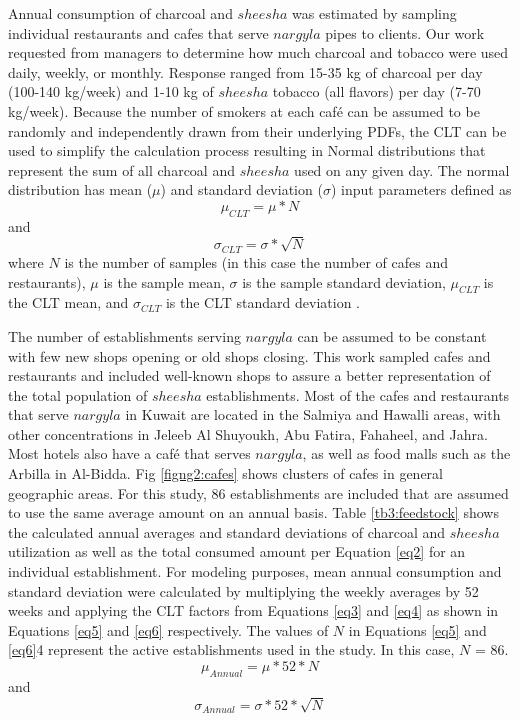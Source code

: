 Annual consumption of charcoal and $sheesha$ was estimated by sampling individual restaurants and cafes that serve $nargyla$ pipes to clients.  Our work requested from  managers to determine how much charcoal and tobacco were used daily, weekly, or monthly.  Response ranged from 15-35 kg of charcoal per day (100-140 kg/week) and 1-10 kg of $sheesha$ tobacco (all flavors) per day (7-70 kg/week).  Because the number of smokers at each café can be assumed to be randomly and independently drawn from their underlying PDFs, the CLT can be used to simplify the calculation process resulting in Normal distributions that represent the sum of all charcoal and $sheesha$ used on any given day.  The normal distribution has mean ($\mu$) and standard deviation ($\sigma$) input parameters defined as
%
\begin{equation}
\label{eq3}
\mu_{CLT}= \mu*N
\end{equation}
%
\noindent
and 
%
\begin{equation}
\label{eq4}
\sigma_{CLT}= \sigma*\sqrt{N}
\end{equation}
%
\noindent
where $N$ is the number of samples (in this case the number of cafes and restaurants), $\mu$ is the sample mean, $\sigma$ is the sample standard deviation, $\mu_{CLT}$ is the CLT mean, and $\sigma_{CLT}$ is the CLT standard deviation \citep{Ott1981}. 

The number of establishments serving $nargyla$ can be assumed to be constant with few new shops opening or old shops closing.  This work sampled cafes and restaurants and included well-known shops to assure a better representation of the total population of $sheesha$ establishments.   Most of the cafes and restaurants that serve $nargyla$ in Kuwait are located in the Salmiya and Hawalli areas, with other concentrations in Jeleeb Al Shuyoukh, Abu Fatira, Fahaheel, and Jahra.  Most hotels also have a caf\'e that serves $nargyla$, as well as food malls such as the Arbilla in Al-Bidda.  Fig \ref{figng2:cafes} shows clusters of cafes in general geographic areas.  For this study, 86 establishments are included that are assumed to use the same average amount on an annual basis.  Table \ref{tb3:feedstock} shows the calculated annual averages and standard deviations of charcoal and $sheesha$ utilization as well as the total consumed amount per Equation \ref{eq2} for an individual establishment.  For modeling purposes, mean annual consumption and standard deviation were calculated by multiplying the weekly averages by 52 weeks and applying the CLT factors from Equations \ref{eq3} and \ref{eq4} as shown in Equations \ref{eq5} and \ref{eq6} respectively.  The values of $N$ in Equations \ref{eq5} and \ref{eq6}4 represent the active establishments used in the study.  In this case, $N$ = 86.
%
\begin{equation}
\label{eq5}
\mu_{Annual}= \mu*52*N
\end{equation}
%
\noindent
and 
%
\begin{equation}
\label{eq6}
\sigma_{Annual}= \sigma*52*\sqrt{N}
\end{equation}
%
\noindent


